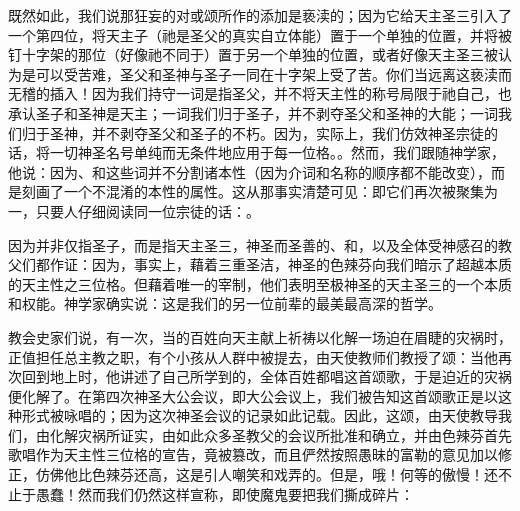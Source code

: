 既然如此，我们说那狂妄的对或颂所作的添加是亵渎的；因为它给天主圣三引入了一个第四位，将天主子（祂是圣父的真实自立体能）置于一个单独的位置，并将被钉十字架的那位（好像祂不同于）置于另一个单独的位置，或者好像天主圣三被认为是可以受苦难，圣父和圣神与圣子一同在十字架上受了苦。你们当远离这亵渎而无稽的插入！因为我们持守一词是指圣父，并不将天主性的称号局限于祂自己，也承认圣子和圣神是天主；一词我们归于圣子，并不剥夺圣父和圣神的大能；一词我们归于圣神，并不剥夺圣父和圣子的不朽。因为，实际上，我们仿效神圣宗徒的话，将一切神圣名号单纯而无条件地应用于每一位格。。然而，我们跟随神学家，他说：因为、和这些词并不分割诸本性（因为介词和名称的顺序都不能改变），而是刻画了一个不混淆的本性的属性。这从那事实清楚可见：即它们再次被聚集为一，只要人仔细阅读同一位宗徒的话：。\par

因为并非仅指圣子，而是指天主圣三，神圣而圣善的、和，以及全体受神感召的教父们都作证：因为，事实上，藉着三重圣洁，神圣的色辣芬向我们暗示了超越本质的天主性之三位格。但藉着唯一的宰制，他们表明至极神圣的天主圣三的一个本质和权能。神学家确实说：这是我们的另一位前辈的最美最高深的哲学。\par

教会史家们说，有一次，当的百姓向天主献上祈祷以化解一场迫在眉睫的灾祸时，正值担任总主教之职，有个小孩从人群中被提去，由天使教师们教授了颂：当他再次回到地上时，他讲述了自己所学到的，全体百姓都唱这首颂歌，于是迫近的灾祸便化解了。在第四次神圣大公会议，即大公会议上，我们被告知这首颂歌正是以这种形式被咏唱的；因为这次神圣会议的记录如此记载。因此，这颂，由天使教导我们，由化解灾祸所证实，由如此众多圣教父的会议所批准和确立，并由色辣芬首先歌唱作为天主性三位格的宣告，竟被篡改，而且俨然按照愚昧的富勒的意见加以修正，仿佛他比色辣芬还高，这是引人嘲笑和戏弄的。但是，哦！何等的傲慢！还不止于愚蠢！然而我们仍然这样宣称，即使魔鬼要把我们撕成碎片：\par

